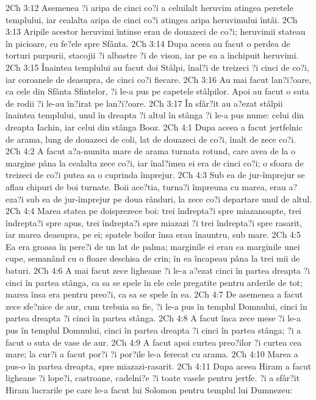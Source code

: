 2Ch 3:12  Asemenea ?i aripa de cinci co?i a celuilalt heruvim atingea peretele templului, iar cealalta aripa de cinci co?i atingea aripa heruvimului întâi.
2Ch 3:13  Aripile acestor heruvimi întinse erau de douazeci de co?i; heruvimii stateau în picioare, cu fe?ele spre Sfânta.
2Ch 3:14  Dupa aceea au facut o perdea de torturi purpurii, stacojii ?i albastre ?i de vison, iar pe ea a închipuit heruvimi.
2Ch 3:15  Înaintea templului au facut doi Stâlpi, înal?i de treizeci ?i cinci de co?i, iar coroanele de deasupra, de cinci co?i fiecare.
2Ch 3:16  Au mai facut lan?i?oare, ca cele din Sfânta Sfintelor, ?i le-a pus pe capetele stâlpilor. Apoi au facut o suta de rodii ?i le-au în?irat pe lan?i?oare.
2Ch 3:17  În sfâr?it au a?ezat stâlpii înaintea templului, unul în dreapta ?i altul în stânga ?i le-a pus nume: celui din dreapta Iachin, iar celui din stânga Booz.
2Ch 4:1  Dupa aceea a facut jertfelnic de arama, lung de douazeci de coli, lat de douazeci de co?i, înalt de zece co?i.
2Ch 4:2  A facut a?a-numita mare de arama turnata rotund, care avea de la o margine pâna la cealalta zece co?i, iar înal?imea ei era de cinci co?i; o sfoara de treizeci de co?i putea sa o cuprinda împrejur.
2Ch 4:3  Sub ea de jur-împrejur se aflau chipuri de boi turnate. Boii ace?tia, turna?i împreuna cu marea, erau a?eza?i sub ea de jur-împrejur pe doua rânduri, la zece co?i departare unul de altul.
2Ch 4:4  Marea statea pe doisprezece boi: trei îndrepta?i spre miazanoapte, trei îndrepta?i spre apus, trei îndrepta?i spre miazazi ?i trei îndrepta?i spre rasarit, iar marea deasupra, pe ei; spatele boilor însa erau înauntru, sub mare.
2Ch 4:5  Ea era groasa în pere?i de un lat de palma; marginile ei erau ca marginile unei cupe, semanând cu o floare deschisa de crin; în ea încapeau pâna la trei mii de baturi.
2Ch 4:6  A mai facut zece ligheane ?i le-a a?ezat cinci în partea dreapta ?i cinci în partea stânga, ca sa se spele în ele cele pregatite pentru arderile de tot; marea însa era pentru preo?i, ca sa se spele în ea.
2Ch 4:7  De asemenea a facut zece sfe?nice de aur, cum trebuia sa fie, ?i le-a pus în templul Domnului, cinci în partea dreapta ?i cinci în partea stânga.
2Ch 4:8  A facut înca zece mese ?i le-a pus în templul Domnului, cinci în partea dreapta ?i cinci în partea stânga; ?i a facut o suta de vase de aur.
2Ch 4:9  A facut apoi curtea preo?ilor ?i curtea cea mare; la cur?i a facut por?i ?i por?ile le-a ferecat cu arama.
2Ch 4:10  Marea a pus-o în partea dreapta, spre miazazi-rasarit.
2Ch 4:11  Dupa aceea Hiram a facut ligheane ?i lope?i, castroane, cadelni?e ?i toate vasele pentru jertfe. ?i a sfâr?it Hiram lucrarile pe care le-a facut lui Solomon pentru templul lui Dumnezeu:
